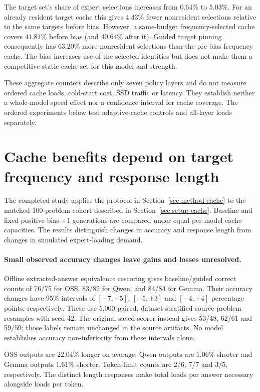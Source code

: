 \documentclass[12pt,a4paper,twoside,openright]{book}
\begin{document}
The target set's share of expert selections increases from $0.64\%$ to
$5.03\%$. For an already resident target cache this gives $4.43\%$ fewer
nonresident selections relative to the same targets before bias. However,
a same-budget frequency-selected cache covers $41.81\%$ before bias
(and $40.64\%$ after it). Guided target pinning consequently has
$63.20\%$ more nonresident selections than the pre-bias frequency cache.
The bias increases use of the selected identities but does not make them
a competitive static cache set for this model and strength.

These aggregate counters describe only seven policy layers and do not
measure ordered cache loads, cold-start cost, SSD traffic or latency.
They establish neither a whole-model speed effect nor a confidence interval
for cache coverage. The ordered experiments below test adaptive-cache
controls and all-layer loads separately.

\section{Cache benefits depend on target frequency and response length}
\label{sec:multimodel-cache-100}
\label{sec:oss-cache-100}

The completed study applies the protocol in
Section~\ref{sec:method-cache} to the matched 100-problem cohort described
in Section~\ref{sec:setup-cache}. Baseline and fixed positive bias-$+1$
generations are compared under equal per-model cache capacities. The
results distinguish changes in accuracy and response length from changes
in simulated expert-loading demand.

\paragraph{Small observed accuracy changes leave gains and losses unresolved.}
Offline extracted-answer equivalence rescoring gives baseline/guided correct
counts of 76/75 for OSS, 83/82 for Qwen, and 84/84 for Gemma. Their accuracy
changes have 95\% intervals of $[-7,+5]$, $[-5,+3]$ and $[-4,+4]$ percentage
points, respectively. These use 5,000 paired, dataset-stratified
source-problem resamples with seed 42. The original saved scorer instead gives
53/48, 62/61 and 59/59; those labels remain unchanged in the source artifacts.
No model establishes accuracy non-inferiority from these intervals alone.

OSS outputs are $22.04\%$ longer on average; Qwen outputs are $1.06\%$
shorter and Gemma outputs $1.61\%$ shorter. Token-limit counts are 2/6,
7/7 and 3/5, respectively. The distinct length responses make total loads
per answer necessary alongside loads per token.
\end{document}

